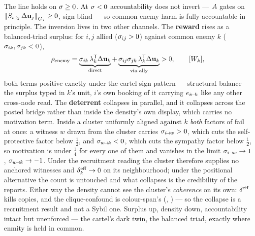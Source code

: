 \documentclass[../main]{subfiles}
\begin{document}
The line holds on $\sigma\ge0$. At $\sigma<0$ accountability does not invert ---
$A$ gates on $\left\lVert S\sb{ i\!\to\!j }\,\Delta\mathbf{u}\sb{j} \right\rVert\sb{ \ensuremath{G\sb{\star}} }\ge0$, sign-blind --- so
common-enemy harm is fully accountable in principle. The inversion lives in two other
channels. The \textbf{reward} rises as a balanced-triad surplus: for $i,j$ allied
($\sigma\sb{ ij }>0$) against common enemy $k$ ($\sigma\sb{ ik },\sigma\sb{ jk }<0$),
\begin{equation}
  \rho\sb{\mathrm{enemy}}=\underbrace{\sigma\sb{ ik }\,\lambda\sb{k}\sp{\mathsf{T}}\Delta\mathbf{u}\sb{k}}
    _{\text{direct}}+\underbrace{\sigma\sb{ ij }\sigma\sb{ jk }\,
    \lambda\sb{k}\sp{\mathsf{T}}\Delta\mathbf{u}\sb{k}}_{\text{via ally}}>0,\qquad[W\sb{k}],
  \label{eq:opp:enemy}
\end{equation}
both terms positive exactly under the cartel sign-pattern --- structural balance --- the
surplus typed in $k$'s unit, $i$'s own booking of it carrying $e\sb{ \ensuremath{i\!\leftarrow\!k} }$ like any
other cross-node read. The
\textbf{deterrent} collapses in parallel, and it collapses across the posted bridge
 rather than inside the density's own display, which carries no motivation
term. Inside a cluster uniformly aligned against $k$ \emph{both} factors of 
fail at once: a witness $w$ drawn from the cluster carries $\sigma\sb{ i\!\to\!w }>0$, which cuts
the self-protective factor below $\tfrac12$, and $\sigma\sb{ w\!\to\!k }<0$, which cuts the
sympathy factor below $\tfrac12$, so motivation is under $\tfrac14$ for every one of them
and vanishes in the limit $\sigma\sb{ i\!\to\!w }\to1$, $\sigma\sb{ w\!\to\!k }\to-1$. Under the
recruitment reading the cluster therefore supplies no anchored witnesses and
$\effdensity[k]\to0$ on its neighbourhood; under the positional alternative the count is
untouched and what collapses is the credibility of the reports. Either way the density
cannot see the cluster's \emph{coherence} on its own: $\effdensity$ kills copies, and the
clique-confound is colour-span's (, ) --- so the collapse is a
recruitment result and not a Sybil one. Surplus up,
density down, accountability intact but unenforced --- the cartel's dark twin, the balanced
triad, exactly where enmity is held in common.
\end{document}
